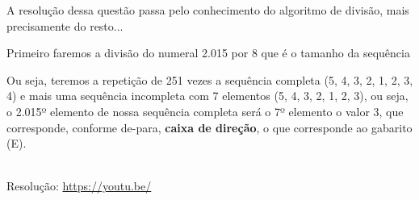 \noindent {}

A resolução dessa questão passa pelo conhecimento do algoritmo de divisão, mais precisamente do resto...

Primeiro faremos a divisão do numeral 2.015 por 8 que é o tamanho da sequência 


Ou seja, teremos a repetição de 251 vezes a sequência completa (5, 4, 3, 2, 1, 2, 3, 4) e mais uma sequência incompleta com 7 elementos (5, 4, 3, 2, 1, 2, 3), ou seja, o 2.015º elemento de nossa sequência completa será o 7º elemento o valor 3, que corresponde, conforme de-para, \textbf{caixa de direção}, o que corresponde ao gabarito (E). 


\begin{center}
    \href{https://youtu.be/}{
    }\\
    Resolução: \url{https://youtu.be/}
\end{center}
